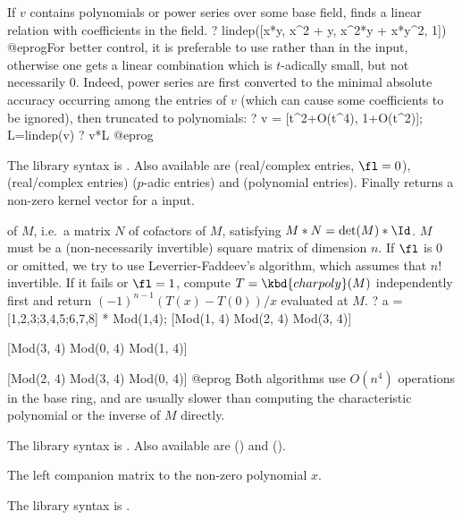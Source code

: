 If $v$ contains polynomials or power series over some base field, finds a
linear relation with coefficients in the field.
\bprog
? lindep([x*y, x^2 + y, x^2*y + x*y^2, 1])
@eprog\noindent For better control, it is preferable to use  rather
than  in the input, otherwise one gets a linear combination which is
$t$-adically small, but not necessarily $0$. Indeed, power series are first
converted to the minimal absolute accuracy occurring among the entries of $v$
(which can cause some coefficients to be ignored), then truncated to
polynomials:
\bprog
? v = [t^2+O(t^4), 1+O(t^2)]; L=lindep(v)
? v*L
@eprog

The library syntax is .
Also available are  (real/complex entries,
$\fl=0$),  (real/complex entries)
 ($p$-adic entries) and
 (polynomial entries).
Finally  returns a non-zero kernel vector for a
 input.

\label{se:matadjoint}
 of $M$, i.e.~a matrix $N$
of cofactors of $M$, satisfying $M*N=\det(M)*\Id$. $M$ must be a
(non-necessarily invertible) square matrix of dimension $n$.
If $\fl$ is 0 or omitted, we try to use Leverrier-Faddeev's algorithm,
which assumes that $n!$ invertible. If it fails or $\fl = 1$,
compute $T = \kbd{charpoly}(M)$ independently first and return
$(-1)^{n-1} (T(x)-T(0))/x$ evaluated at $M$.
\bprog
? a = [1,2,3;3,4,5;6,7,8] * Mod(1,4);
[Mod(1, 4) Mod(2, 4) Mod(3, 4)]

[Mod(3, 4) Mod(0, 4) Mod(1, 4)]

[Mod(2, 4) Mod(3, 4) Mod(0, 4)]
@eprog\noindent
Both algorithms use $O(n^4)$ operations in the base ring, and are usually
slower than computing the characteristic polynomial or the inverse of $M$
directly.

The library syntax is .
Also available are
 () and
 ().

\label{se:matcompanion}
The left companion matrix to the non-zero polynomial $x$.

The library syntax is .

